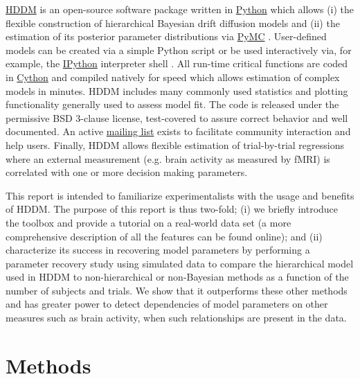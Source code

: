 \documentclass[letterpaper,10pt,english]{article}
\begin{document}
\href{http://github.com/twiecki/hddm}{HDDM} is an open-source software
package written in \href{http://www.python.org/}{Python} which allows
(i) the flexible construction of hierarchical Bayesian drift diffusion
models and (ii) the estimation of its posterior parameter
distributions via \href{http://code.google.com/p/pymc/}{PyMC}
\citep{PatilHuardFonnesbeck10}. User-defined models can be created via
a simple Python script or be used interactively via, for example, the
\href{http://ipython.org}{IPython} interpreter shell
\citep{PerezGranger07}. All run-time critical functions are coded in
\href{http://www.cython.org/}{Cython}
\citep{BehnelBradshawCitroEtAl11} and compiled natively for speed
which allows estimation of complex models in minutes. HDDM includes
many commonly used statistics and plotting functionality generally
used to assess model fit. The code is released under the permissive
BSD 3-clause license, test-covered to assure correct behavior and well
documented. An active
\href{https://groups.google.com/group/hddm-users/}{mailing list}
exists to facilitate community interaction and help users. Finally,
HDDM allows flexible estimation of trial-by-trial regressions where an
external measurement (e.g. brain activity as measured by fMRI) is
correlated with one or more decision making
parameters.

This report is intended to familiarize experimentalists with the usage
and benefits of HDDM. The purpose of this report is thus two-fold; (i)
we briefly introduce the toolbox and provide a tutorial on a
real-world data set (a more comprehensive description of all the
features can be found online); and (ii) characterize its success in
recovering model parameters by performing a parameter recovery study
using simulated data to compare the hierarchical model used in HDDM to
non-hierarchical or non-Bayesian methods as a function of the number
of subjects and trials. We show that it outperforms these other
methods and has greater power to detect dependencies of model
parameters on other measures such as brain activity, when such
relationships are present in the data.


\section*{Methods}
\label{methods:ipython}\label{methods:index-0}\label{methods::doc}\label{methods:methods}\label{methods:chap-methods}
\end{document}
